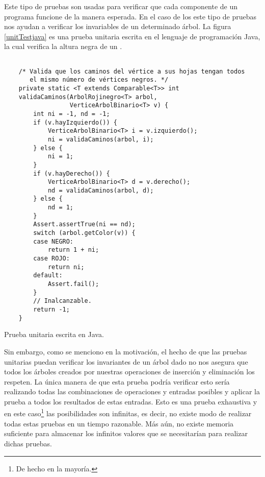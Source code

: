 Este tipo de pruebas son usadas para verificar que cada componente de un programa funcione de
la manera esperada. En el caso de los {\arns} este tipo de pruebas nos ayudan a verificar los
invariables de un determinado \'arbol. La figura \ref{unitTestjava} es una prueba unitaria
escrita en el lenguaje de programaci\'on Java, la cual verifica la altura negra de un {\arn} \cite{CanekPU}.

\begin{listing}[!ht]
\centering
\captionsetup{justification=centering}
\begin{verbatim}

    /* Valida que los caminos del vértice a sus hojas tengan todos
       el mismo número de vértices negros. */
    private static <T extends Comparable<T>> int
    validaCaminos(ArbolRojinegro<T> arbol,
                  VerticeArbolBinario<T> v) {
        int ni = -1, nd = -1;
        if (v.hayIzquierdo()) {
            VerticeArbolBinario<T> i = v.izquierdo();
            ni = validaCaminos(arbol, i);
        } else {
            ni = 1;
        }
        if (v.hayDerecho()) {
            VerticeArbolBinario<T> d = v.derecho();
            nd = validaCaminos(arbol, d);
        } else {
            nd = 1;
        }
        Assert.assertTrue(ni == nd);
        switch (arbol.getColor(v)) {
        case NEGRO:
            return 1 + ni;
        case ROJO:
            return ni;
        default:
            Assert.fail();
        }
        // Inalcanzable.
        return -1;
    }

\end{verbatim}
\caption{Prueba unitaria escrita en Java\cite{CanekPU}.}
\label{unitTestjava}
\end{listing}

Sin embargo, como se menciono en la motivaci\'on, el hecho de que las pruebas unitarias puedan verificar los invariantes de un \'arbol
dado no nos asegura que todos los \'arboles creados por nuestras operaciones de inserci\'on y
eliminaci\'on los respeten. La \'unica manera de que esta prueba podr\'ia verificar esto ser\'ia
realizando todas las combinaciones de operaciones y entradas posibles y aplicar la prueba a todos los
resultados de estas entradas. Esto es una prueba exhaustiva y en este caso\footnote{De hecho en la
mayoría.} las posibilidades son infinitas, es decir, no existe modo de realizar todas estas pruebas
en un tiempo razonable. M\'as a\'un, no existe memoria suficiente para almacenar los infinitos valores que se necesitar\'ian para realizar dichas pruebas. 

